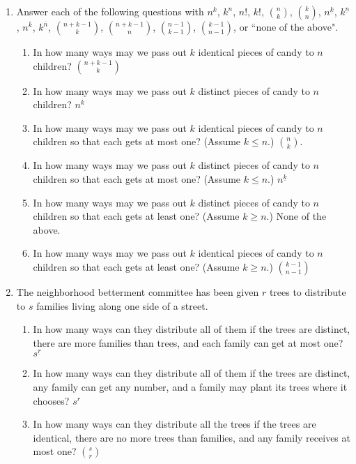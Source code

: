 \documentclass[10pt,]{book}
\theoremstyle{plain}
\theoremstyle{definition}
\numberwithin{equation}{chapter}
\begin{document}
\begin{enumerate}
\item\hypertarget{li-49}{}Answer each of the following questions with \(n^k\), \(k^n\), \(n!\), \(k!\), \(\binom{n}{k}\), \(\binom{k}{n}\), \(n^{\underline{k}}\), \(k^{\underline{n}}\), \(n^{\overline{k}}\), \(k^{\overline{n}}\), \(\binom{n+k-1}{k}\), \(\binom{n+k-1}{n}\), \(\binom{n-1}{k-1}\), \(\binom{k-1}{n-1}\), or ``none of the above". %
\begin{enumerate}
\item\hypertarget{li-50}{}In how many ways may we pass out \(k\) identical pieces of candy to \(n\) children? \(\binom{n+k-1}{k}\)%
%
\item\hypertarget{li-51}{}In how many ways may we pass out \(k\) distinct pieces of candy to \(n\) children? \(n^k\)%
%
\item\hypertarget{li-52}{}In how many ways may we pass out \(k\) identical pieces of candy to \(n\) children so that each gets at most one?  (Assume \(k\le n\).) \(\binom{n}{k}\).%
%
\item\hypertarget{li-53}{}In how many ways may we pass out \(k\) distinct pieces of candy to \(n\) children so that each gets at most one?  (Assume \(k\le n\).) \(n^{\underline{k}}\)%
%
\item\hypertarget{li-54}{}In how many ways may we pass out \(k\) distinct pieces of candy to \(n\) children so that each gets at least one?  (Assume \(k\ge n\).) None of the above.%
%
\item\hypertarget{li-55}{}In how many ways may we pass out \(k\) identical pieces of candy to \(n\) children so that each gets at least one?  (Assume \(k\ge n\).) \(\binom{k-1}{n-1}\)%
%
\end{enumerate}
%
\item\hypertarget{li-56}{}The neighborhood betterment committee has been given \(r\) trees to distribute to \(s\) families living along one side of a street. %
\begin{enumerate}
\item\hypertarget{li-57}{}In how many ways can they distribute all of them if the trees are distinct, there are more families than trees, and each family can get at most one? \(s^{\underline{r}}\)%
%
\item\hypertarget{li-58}{}In how many ways can they distribute all of them if the trees are distinct, any family can get any number, and a family may plant its trees where it chooses? \(s^r\)%
%
\item\hypertarget{li-59}{}In how many ways can they distribute all the trees if the trees are identical, there are no more trees than families,   and any family receives at most one? \(\binom{s}{r}\)%

\end{enumerate}
\end{enumerate}
\end{document}
